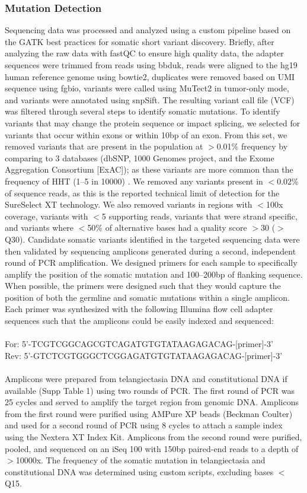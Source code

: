 \subsubsection{Mutation Detection}
Sequencing data was processed and analyzed using a custom pipeline based on the GATK best practices for somatic short variant discovery. Briefly, after analyzing the raw data with fastQC to ensure high quality data, the adapter sequences were trimmed from reads using bbduk, reads were aligned to the hg19 human reference genome using bowtie2, duplicates were removed based on UMI sequence using fgbio, variants were called using MuTect2 in tumor-only mode, and variants were annotated using snpSift. The resulting variant call file (VCF) was filtered through several steps to identify somatic mutations. To identify variants that may change the protein sequence or impact splicing, we selected for variants that occur within exons or within 10bp of an exon. From this set, we removed variants that are present in the population at $>$0.01\% frequency by comparing to 3 databases (dbSNP, 1000 Genomes project, and the Exome Aggregation Consortium [ExAC]); as these variants are more common than the frequency of HHT (1--5 in 10000) \citep{grosse2014}. We removed any variants present in $<$0.02\% of sequence reads, as this is the reported technical limit of detection for the SureSelect XT technology. We also removed variants in regions with $<$100x coverage, variants with $<$5 supporting reads, variants that were strand specific, and variants where $<$50\% of alternative bases had a quality score $>$30 ($>$Q30). 
	Candidate somatic variants identified in the targeted sequencing data were then validated by sequencing amplicons generated during a second, independent round of PCR amplification. We designed primers for each sample to specifically amplify the position of the somatic mutation and 100--200bp of flanking sequence. When possible, the primers were designed such that they would capture the position of both the germline and somatic mutations within a single amplicon. Each primer was synthesized with the following Illumina flow cell adapter sequences such that the amplicons could be easily indexed and sequenced: 
	\\
	\\For: 5’-TCGTCGGCAGCGTCAGATGTGTATAAGAGACAG‐[primer]-3’
	\\Rev: 5’-GTCTCGTGGGCTCGGAGATGTGTATAAGAGACAG‐[primer]-3’
	\\\\
	Amplicons were prepared from telangiectasia DNA and constitutional DNA if available (Supp Table 1) using two rounds of PCR. The first round of PCR was 25 cycles and served to amplify the target region from genomic DNA. Amplicons from the first round were purified using AMPure XP beads (Beckman Coulter) and used for a second round of PCR using 8 cycles to attach a sample index using the Nextera XT Index Kit. Amplicons from the second round were purified, pooled, and sequenced on an iSeq 100 with 150bp paired-end reads to a depth of $>$10000x. The frequency of the somatic mutation in telangiectasia and constitutional DNA was determined using custom scripts, excluding bases $<$Q15. 
